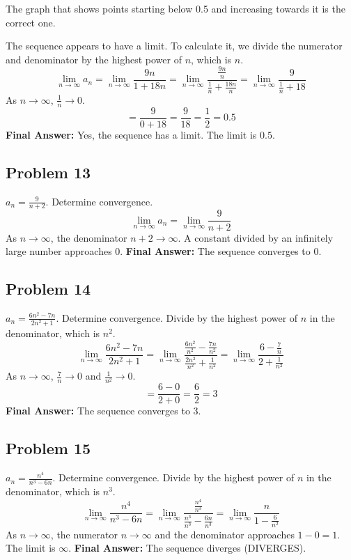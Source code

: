 \documentclass{article}
\begin{document}
The graph that shows points starting below 0.5 and increasing towards it is the correct one.

The sequence appears to have a limit. To calculate it, we divide the numerator and denominator by the highest power of $n$, which is $n$.
\[ \lim_{n \to \infty} a_n = \lim_{n \to \infty} \frac{9n}{1+18n} = \lim_{n \to \infty} \frac{\frac{9n}{n}}{\frac{1}{n}+\frac{18n}{n}} = \lim_{n \to \infty} \frac{9}{\frac{1}{n}+18} \]
As $n \to \infty$, $\frac{1}{n} \to 0$.
\[ = \frac{9}{0+18} = \frac{9}{18} = \frac{1}{2} = 0.5 \]
\textbf{Final Answer:} Yes, the sequence has a limit. The limit is $0.5$.

\subsection{Problem 13}
$a_n = \frac{9}{n+2}$. Determine convergence.
\[ \lim_{n \to \infty} a_n = \lim_{n \to \infty} \frac{9}{n+2} \]
As $n \to \infty$, the denominator $n+2 \to \infty$. A constant divided by an infinitely large number approaches 0.
\textbf{Final Answer:} The sequence converges to 0.

\subsection{Problem 14}
$a_n = \frac{6n^2 - 7n}{2n^2 + 1}$. Determine convergence.
Divide by the highest power of $n$ in the denominator, which is $n^2$.
\[ \lim_{n \to \infty} \frac{6n^2 - 7n}{2n^2 + 1} = \lim_{n \to \infty} \frac{\frac{6n^2}{n^2} - \frac{7n}{n^2}}{\frac{2n^2}{n^2} + \frac{1}{n^2}} = \lim_{n \to \infty} \frac{6 - \frac{7}{n}}{2 + \frac{1}{n^2}} \]
As $n \to \infty$, $\frac{7}{n} \to 0$ and $\frac{1}{n^2} \to 0$.
\[ = \frac{6 - 0}{2 + 0} = \frac{6}{2} = 3 \]
\textbf{Final Answer:} The sequence converges to 3.

\subsection{Problem 15}
$a_n = \frac{n^4}{n^3 - 6n}$. Determine convergence.
Divide by the highest power of $n$ in the denominator, which is $n^3$.
\[ \lim_{n \to \infty} \frac{n^4}{n^3 - 6n} = \lim_{n \to \infty} \frac{\frac{n^4}{n^3}}{\frac{n^3}{n^3} - \frac{6n}{n^3}} = \lim_{n \to \infty} \frac{n}{1 - \frac{6}{n^2}} \]
As $n \to \infty$, the numerator $n \to \infty$ and the denominator approaches $1-0=1$.
The limit is $\infty$.
\textbf{Final Answer:} The sequence diverges (DIVERGES).
\end{document}
